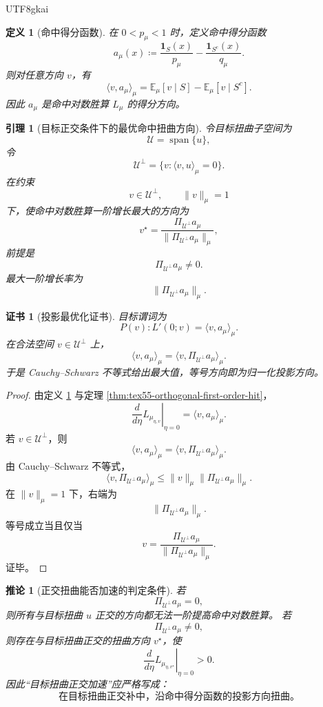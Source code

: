 \documentclass[12pt]{article}
\newtheorem{definition}{定义}[section]
\newtheorem{corollary}{推论}[section]
\newtheorem{lemma}{引理}[section]
\newtheorem{Certificate}{证书}[section]
\newcommand{\DefEq}{\coloneqq}
\begin{document}
\begin{CJK*}{UTF8}{gkai}
\begin{definition}[命中得分函数]
\label{def:tex55-hit-score-function}
在 \(0<p_\mu<1\) 时，定义命中得分函数
\[
  a_\mu(x)
  \DefEq
  \frac{\mathbf 1_S(x)}{p_\mu}
  -
  \frac{\mathbf 1_{S^c}(x)}{q_\mu}.
\]
则对任意方向 \(v\)，有
\[
  \langle v,a_\mu\rangle_\mu
  =
  \mathbb E_\mu[v\mid S]
  -
  \mathbb E_\mu[v\mid S^c].
\]
因此 \(a_\mu\) 是命中对数胜算 \(L_\mu\) 的得分方向。
\end{definition}

\begin{lemma}[目标正交条件下的最优命中扭曲方向]
\label{lem:tex55-optimal-orthogonal-hit-direction}
令目标扭曲子空间为
\[
  \mathcal U=\operatorname{span}\{u\},
\]
令
\[
  \mathcal U^\perp
  =
  \{v:\langle v,u\rangle_\mu=0\}.
\]
在约束
\[
  v\in\mathcal U^\perp,
  \qquad
  \lVert v\rVert_\mu=1
\]
下，使命中对数胜算一阶增长最大的方向为
\[
  v^\star
  =
  \frac{
  \Pi_{\mathcal U^\perp}a_\mu
  }{
  \lVert\Pi_{\mathcal U^\perp}a_\mu\rVert_\mu
  },
\]
前提是
\[
  \Pi_{\mathcal U^\perp}a_\mu\neq0.
\]
最大一阶增长率为
\[
  \lVert\Pi_{\mathcal U^\perp}a_\mu\rVert_\mu.
\]
\end{lemma}

\begin{Certificate}[投影最优化证书]
\label{cert:tex55-optimal-orthogonal-hit-direction}
目标谓词为
\[
  P(v):
  L'(0;v)=\langle v,a_\mu\rangle_\mu.
\]
在合法空间 \(v\in\mathcal U^\perp\) 上，
\[
  \langle v,a_\mu\rangle_\mu
  =
  \langle v,\Pi_{\mathcal U^\perp}a_\mu\rangle_\mu.
\]
于是 Cauchy--Schwarz 不等式给出最大值，等号方向即为归一化投影方向。
\end{Certificate}

\begin{proof}
由定义 \ref{def:tex55-hit-score-function} 与定理
\ref{thm:tex55-orthogonal-first-order-hit}，
\[
  \left.
  \frac{d}{d\eta}
  L_{\mu_{\eta,v}}
  \right|_{\eta=0}
  =
  \langle v,a_\mu\rangle_\mu.
\]
若 \(v\in\mathcal U^\perp\)，则
\[
  \langle v,a_\mu\rangle_\mu
  =
  \langle v,\Pi_{\mathcal U^\perp}a_\mu\rangle_\mu.
\]
由 Cauchy--Schwarz 不等式，
\[
  \langle v,\Pi_{\mathcal U^\perp}a_\mu\rangle_\mu
  \le
  \lVert v\rVert_\mu
  \lVert\Pi_{\mathcal U^\perp}a_\mu\rVert_\mu.
\]
在 \(\lVert v\rVert_\mu=1\) 下，右端为
\[
  \lVert\Pi_{\mathcal U^\perp}a_\mu\rVert_\mu.
\]
等号成立当且仅当
\[
  v
  =
  \frac{
  \Pi_{\mathcal U^\perp}a_\mu
  }{
  \lVert\Pi_{\mathcal U^\perp}a_\mu\rVert_\mu
  }.
\]
证毕。
\end{proof}

\begin{corollary}[正交扭曲能否加速的判定条件]
\label{cor:tex55-orthogonal-acceleration-criterion}
若
\[
  \Pi_{\mathcal U^\perp}a_\mu=0,
\]
则所有与目标扭曲 \(u\) 正交的方向都无法一阶提高命中对数胜算。
若
\[
  \Pi_{\mathcal U^\perp}a_\mu\neq0,
\]
则存在与目标扭曲正交的扭曲方向 \(v^\star\)，使
\[
  \left.
  \frac{d}{d\eta}
  L_{\mu_{\eta,v^\star}}
  \right|_{\eta=0}
  >
  0.
\]
因此“目标扭曲正交加速”应严格写成：
\[
  \boxed{
  \text{在目标扭曲正交补中，沿命中得分函数的投影方向扭曲。}
  }
\]
\end{corollary}


\end{CJK*}
\end{document}
